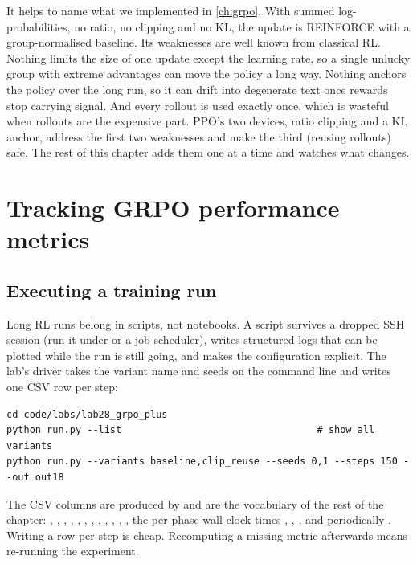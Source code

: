 It helps to name what we implemented in \cref{ch:grpo}. With summed log-probabilities, no
ratio, no clipping and no KL, the update is REINFORCE with a group-normalised baseline. Its
weaknesses are well known from classical RL. Nothing limits the size of one update except
the learning rate, so a single unlucky group with extreme advantages can move the policy a
long way. Nothing anchors the policy over the long run, so it can drift into degenerate text
once rewards stop carrying signal. And every rollout is used exactly once, which is wasteful
when rollouts are the expensive part. PPO's two devices, ratio clipping and a KL anchor,
address the first two weaknesses and make the third (reusing rollouts) safe. The rest of this
chapter adds them one at a time and watches what changes.

\section{Tracking GRPO performance metrics}\label{sec:grpo2:metrics}

\subsection{Executing a training run}\label{sec:grpo2:exec}

Long RL runs belong in scripts, not notebooks. A script survives a dropped SSH session
(run it under  or a job scheduler), writes structured logs that can be plotted
while the run is still going, and makes the configuration explicit. The lab's driver takes
the variant name and seeds on the command line and writes one CSV row per step:

\begin{lstlisting}[style=shell,caption={Running GRPO variants from the terminal.},label={lst:grpo2:run}]
cd code/labs/lab28_grpo_plus
python run.py --list                                  # show all variants
python run.py --variants baseline,clip_reuse --seeds 0,1 --steps 150 --out out18
\end{lstlisting}

The CSV columns are produced by  and are the vocabulary of the rest
of the chapter: , , , ,
, , , ,
, , , , the per-phase
wall-clock times , , , and periodically
. Writing a row per step is cheap. Recomputing a missing metric afterwards
means re-running the experiment.


